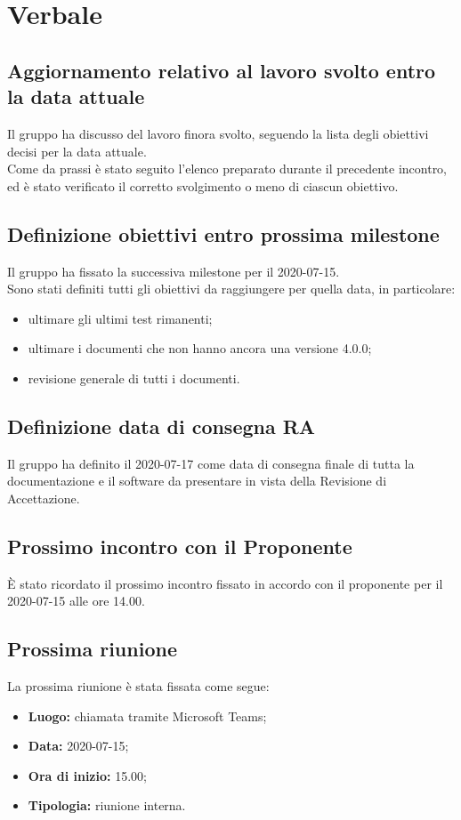 \section{Verbale}

	\subsection{Aggiornamento relativo al lavoro svolto entro la data attuale}
	Il gruppo ha discusso del lavoro finora svolto, seguendo la lista degli obiettivi decisi per la data attuale. \\
	Come da prassi è stato seguito l'elenco preparato durante il precedente incontro, ed è stato verificato il corretto svolgimento o meno di ciascun obiettivo.
	
	\subsection{Definizione obiettivi entro prossima milestone}
		Il gruppo ha fissato la successiva milestone per il 2020-07-15.\\
		Sono stati definiti tutti gli obiettivi da raggiungere per quella data, in particolare:
		\begin{itemize}
			\item ultimare gli ultimi test rimanenti;
			\item ultimare i documenti che non hanno ancora una versione 4.0.0;
			\item revisione generale di tutti i documenti.
		\end{itemize}
	
	\subsection{Definizione data di consegna RA}
		Il gruppo ha definito il 2020-07-17 come data di consegna finale di tutta la documentazione e il software da presentare in vista della Revisione di Accettazione.
		
	\subsection{Prossimo incontro con il Proponente}
		È stato ricordato il prossimo incontro fissato in accordo con il proponente per il 2020-07-15 alle ore 14.00.
	
	\subsection{Prossima riunione}
		La prossima riunione è stata fissata come segue:
		\begin{itemize}
			\item \textbf{Luogo:} chiamata tramite Microsoft Teams; 
			\item \textbf{Data:} 2020-07-15;
			\item \textbf{Ora di inizio:} 15.00;
			\item \textbf{Tipologia:} riunione interna.
		\end{itemize}